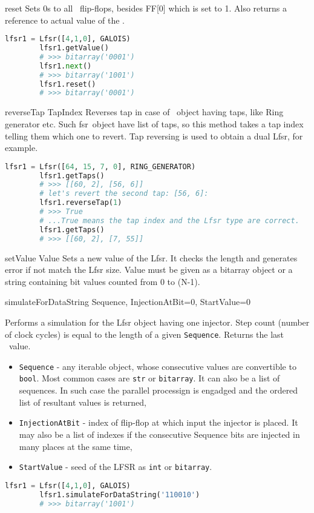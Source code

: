  {reset} {} {
	Sets 0s to all \Lfsr\ flip-flops, besides FF[0] which is set to 1. Also returns a reference to actual value of the \Lfsr.
}
\begin{lstlisting}[language=Python]
		lfsr1 = Lfsr([4,1,0], GALOIS)
		lfsr1.getValue()
		# >>> bitarray('0001')
		lfsr1.next()
		# >>> bitarray('1001')
		lfsr1.reset()
		# >>> bitarray('0001')
\end{lstlisting}

 {reverseTap} {TapIndex} {
	Reverses tap in case of \Lfsr\ object having taps, like Ring generator etc. Such \:fsr\ object have list of taps, so this method takes a tap index telling them which one to revert. Tap reversing is used to obtain a dual Lfsr, for example.
}
\begin{lstlisting}[language=Python]
		lfsr1 = Lfsr([64, 15, 7, 0], RING_GENERATOR)
		lfsr1.getTaps()
		# >>> [[60, 2], [56, 6]]
		# let's revert the second tap: [56, 6]:
		lfsr1.reverseTap(1)
		# >>> True
		# ...True means the tap index and the Lfsr type are correct.
		lfsr1.getTaps()
		# >>> [[60, 2], [7, 55]]
\end{lstlisting}

 {setValue} {Value} {
	Sets a new value of the Lfsr. It checks the length and generates error if not match the Lfsr size. Value must be given as a bitarray object or a string containing bit values counted from 0 to (N-1).
}

 {simulateForDataString} {Sequence, InjectionAtBit=0, StartValue=0} {
	Performs a simulation for the Lfsr object having one injector. Step count (number of clock cycles) is equal to the length of a given \texttt{Sequence}. Returns the last \Lfsr\ value.
	\begin{itemize}
		\item \texttt{Sequence} - any iterable object, whose consecutive values are convertible to \texttt{bool}. Most common cases are \texttt{str} or \texttt{bitarray}. It can also be a list of sequences. In such case the parallel processign is engadged and the ordered list of resultant values is returned,
		\item \texttt{InjectionAtBit} - index of flip-flop at which input the injector is placed. It may also be a list of indexes if the consecutive Sequence bits are injected in many places at the same time,
		\item \texttt{StartValue} - seed of the LFSR as \texttt{int} or \texttt{bitarray}.
	\end{itemize}
}
\begin{lstlisting}[language=Python]
		lfsr1 = Lfsr([4,1,0], GALOIS)
		lfsr1.simulateForDataString('110010')
		# >>> bitarray('1001')
\end{lstlisting}

